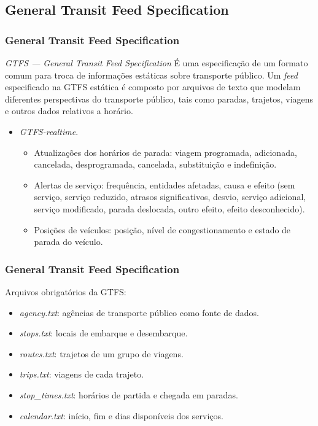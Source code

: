 \documentclass{beamer}
\begin{document}
\subsection{General Transit Feed Specification}
\begin{frame}
\frametitle{General Transit Feed Specification}
\begin{block}{\textit{GTFS --- General Transit Feed Specification}}
É uma especificação de um formato comum para troca de informações estáticas sobre transporte público. Um \textit{feed} especificado na GTFS estática é composto por arquivos de texto que modelam diferentes perspectivas do transporte público, tais como paradas, trajetos, viagens e outros dados relativos a horário.
\end{block}
\begin{itemize}
\item {\textit{GTFS-realtime}}.
\begin{itemize}
\item Atualizações dos horários de parada: viagem programada, adicionada, cancelada, desprogramada, cancelada, substituição e indefinição.
\item Alertas de serviço: frequência, entidades afetadas, causa e efeito (sem serviço, serviço reduzido, atrasos significativos, desvio, serviço adicional, serviço modificado, parada deslocada, outro efeito, efeito desconhecido).
\item Posições de veículos: posição, nível de congestionamento e estado de parada do veículo.
\end{itemize}
\end{itemize}
\end{frame}
\begin{frame}
\frametitle{General Transit Feed Specification}
Arquivos obrigatórios da GTFS:
\begin{itemize}
\item \textit{agency.txt}: agências de transporte público como fonte de dados.
\item \textit{stops.txt}: locais de embarque e desembarque.
\item \textit{routes.txt}: trajetos de um grupo de viagens.
\item \textit{trips.txt}: viagens de cada trajeto.
\item \textit{stop\_times.txt}: horários de partida e chegada em paradas.
\item \textit{calendar.txt}: início, fim e dias disponíveis dos serviços.
\end{itemize}
\end{frame}
\end{document}
